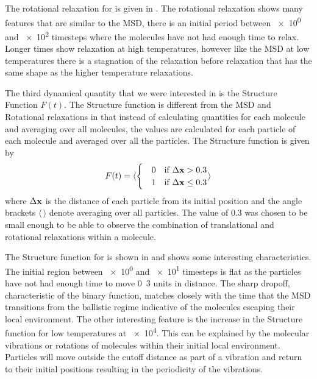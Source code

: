 The rotational relaxation for \sone is given in . The rotational relaxation shows many features that are similar to the MSD, there is an initial period between \num{e0} and \num{e2} timesteps where the molecules have not had enough time to relax. Longer times show relaxation at high temperatures, however like the MSD at low temperatures there is a stagnation of the relaxation before relaxation that has the same shape as the higher temperature relaxations.

The third dynamical quantity that we were interested in is the Structure Function $F(t)$. The Structure function is different from the MSD and Rotational relaxations in that instead of calculating quantities for each molecule and averaging over all molecules, the values are calculated for each particle of each molecule and averaged over all the particles. The Structure function is given by
\begin{align}
    F(t) = \langle \begin{cases}
        \quad0 &\text{if } \Delta \mathbf{x} > 0.3 \\
        \quad1 &\text{if } \Delta \mathbf{x} \leq 0.3
    \end{cases} \rangle
\end{align}
where $\Delta \mathbf{x}$ is the distance of each particle from its initial position and the angle brackets $\langle\,\rangle$ denote averaging over all particles. The value of \num{0.3} was chosen to be small enough to be able to observe the combination of translational and rotational relaxations within a molecule.

The Structure function for \sone is shown in  and shows some interesting characteristics. The initial region between \num{e0} and \num{e1} timesteps is flat as the particles have not had enough time to move \si{0.3} units in distance. The sharp dropoff, characteristic of the binary function, matches closely with the time that the MSD transitions from the ballistic regime indicative of the molecules escaping their local environment. The other interesting feature is the increase in the Structure function for low temperatures at \num{e4}. This can be explained by the molecular vibrations or rotations of molecules within their initial local environment. Particles will move outside the cutoff distance as part of a vibration and return to their initial positions resulting in the periodicity of the vibrations.

